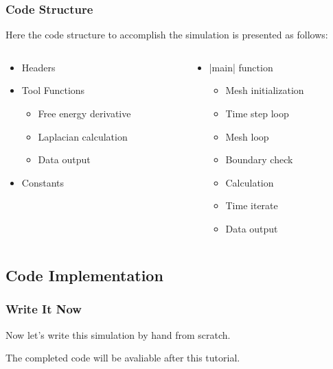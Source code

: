 \documentclass[compress,xcolor={dvipsnames}]{beamer}
\begin{document}
\begin{frame}[fragile]
    \frametitle{Code Structure}

    Here the code structure to accomplish the simulation is presented as follows:
    \begin{columns}
        \begin{column}{.5\linewidth}
            \begin{itemize}
                \item Headers
                \item Tool Functions
                      \begin{itemize}
                          \item Free energy derivative
                          \item Laplacian calculation
                          \item Data output
                      \end{itemize}
                \item Constants
            \end{itemize}
        \end{column}
        \hspace{-20pt}
        \begin{column}{.5\linewidth}
            \begin{itemize}
                \item \cverb|main| function
                      \begin{itemize}
                          \item Mesh initialization
                          \item Time step loop
                          \item Mesh loop
                          \item Boundary check
                          \item Calculation
                          \item Time iterate
                          \item Data output
                      \end{itemize}
            \end{itemize}
        \end{column}
    \end{columns}

\end{frame}

\subsection{Code Implementation}
\begin{frame}
    \frametitle{Write It Now}

    Now let's write this simulation by hand from scratch.

    The completed code will be avaliable after this tutorial.

\end{frame}
\end{document}

